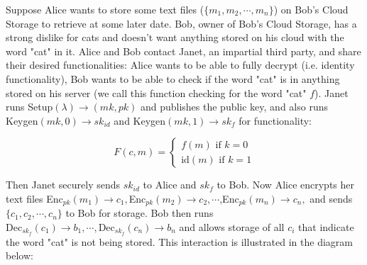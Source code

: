 \documentclass[12pt,twoside]{reedthesis}
\newcommand{\dec}[0]{\text{Dec}}
\begin{document}
\par Suppose Alice wants to store some text files ($\{m_1,m_2,\cdots, m_n \}$) on Bob's Cloud Storage to retrieve at some later date.
 Bob, owner of Bob's Cloud Storage, has a strong dislike for cats and doesn't want anything stored on
  his cloud with the word "cat" in it. Alice and Bob contact Janet, an impartial third party, and share their desired functionalities: Alice wants to be able to fully decrypt (i.e. identity functionality), Bob wants to be able to check if the word "cat" is in anything stored on his server (we call this function checking for the word "cat" $f$). Janet runs Setup$(\lambda)\rightarrow (mk, pk)$ and publishes the public key, and also runs Keygen$(mk,0) \rightarrow sk_{id}$ and Keygen$(mk,1) \rightarrow sk_f$ for functionality:

$$F(c,m) = 
\begin{cases}
f(m) \text{ if } k = 0 \\
\text{id}(m) \text{ if } k = 1
\end{cases} $$


Then Janet securely sends $sk_{id}$ to Alice and $sk_{f}$ to Bob. Now Alice encrypts her text files Enc$_{pk}(m_1) \rightarrow c_1,$Enc$_{pk}(m_2) \rightarrow c_2, \cdots $,Enc$_{pk}(m_n) \rightarrow c_n,$ and sends $\{c_1,c_2, \cdots, c_n \}$ to Bob for storage. Bob then runs $\dec_{sk_f}(c_1) \rightarrow b_1 , \cdots, \dec_{sk_f}(c_n) \rightarrow b_n $ and allows storage of all $c_i$ that indicate the word "cat" is not being stored.  This interaction is illustrated in the diagram below:

\end{document}

